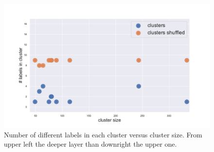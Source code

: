 \begin{figure}[htb!]
\begin{minipage}{0.45\textwidth}
    \end{minipage}
    \hspace{3mm}
    \begin{minipage}{0.45\textwidth}
    \includegraphics[width=0.9\linewidth]{pictures/topic/gtex/oversigma_10tissue/shuffledcluster_shuffle_label_size_l3_primary_site.pdf}
    \end{minipage}
\label{fig:topic/gtex/oversigma_10tissue/shuffledcluster_shuffle_label_size_lall}
\caption{Number of different labels in each cluster versus cluster size. From upper left the deeper layer than downright the upper one.}
\end{figure}

